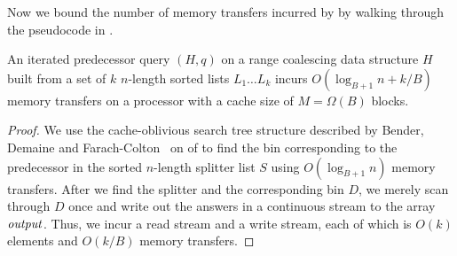 Now we bound the number of memory transfers incurred by  by walking 
through the pseudocode in .

\begin{theorem}
An iterated predecessor query $(H,q)$ on a range coalescing data 
structure $H$ built from a set of $k$ $n$-length sorted lists $L_1 \ldots L_k$ 
incurs $O(\log_{B+1} n + k/B)$ memory transfers on a processor with a cache 
size of $M = \Omega(B)$ blocks.
\end{theorem}
\begin{proof}
We use the cache-oblivious search tree structure described by Bender, 
Demaine and Farach-Colton~\cite{BenderDeFa00} on  of 
 to find the bin corresponding to the predecessor in the 
sorted $n$-length splitter list $S$ using $O(\log_{B+1}n)$ memory transfers.
After we find the splitter and the corresponding bin $D$, we merely scan through
$D$ once and write out the answers in a continuous stream to the array $\id{output}$.
Thus, we incur a read stream and a write stream, each of which is $O(k)$ elements
and $O(k/B)$ memory transfers.
\end{proof}

